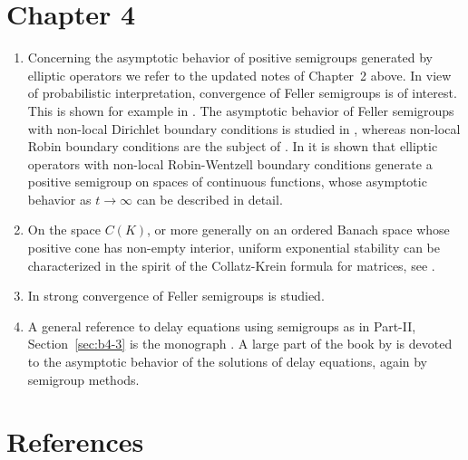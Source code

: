 \section*{Chapter 4}
\begin{enumerate}
\item 
Concerning the asymptotic behavior of positive semigroups generated by elliptic operators we refer to the updated notes of Chapter~2 above. 
In view of probabilistic interpretation, convergence of Feller semigroups is of interest. 
This is shown for example in \textcite{zbmath07694938}.
The asymptotic behavior of Feller semigroups with non-local Dirichlet boundary conditions is studied in \textcite{zbmath06548310}, whereas non-local Robin boundary conditions are the subject of 
\textcite{zbmath07009711}. 
In \textcite{arXiv:2502.03216} it is shown that elliptic operators with non-local Robin-Wentzell boundary conditions generate a positive semigroup on spaces of continuous functions, whose asymptotic behavior as $t \rightarrow \infty$ can be described in detail.

\item
On the space $C(K)$, or more generally on an ordered Banach space whose positive cone has non-empty interior, uniform exponential stability can be characterized in the spirit of the  Collatz-Krein formula for matrices, see \textcite{zbmath07964911}.

\item
In \textcite{zbmath06289415} strong convergence of Feller semigroups is studied.

\item
A general reference to delay equations using semigroups as in Part-II, Section~\ref{sec:b4-3} is the monograph \textcite{zbmath00770062}. 
A large part of the book by \textcite{zbmath02215036} is devoted to the asymptotic behavior of the solutions of delay equations, again by semigroup methods.

\end{enumerate}
\section*{References}
{\RaggedRight
  \printbibliography[heading=none]
 }